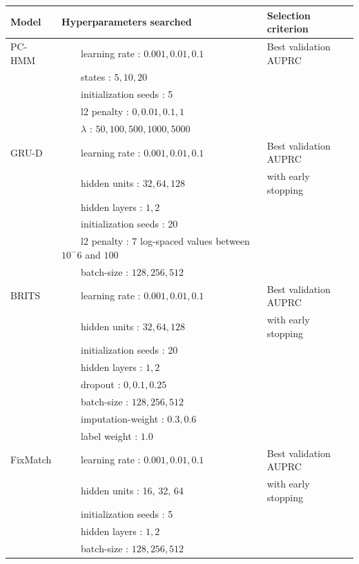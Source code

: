 \newcommand{\tabitem}{~~\llap{\textbullet}~~}
\begin{table}[!t]
  \centering
  \begin{tabular}{|l|l|l|}
    \hline
    Model & Hyperparameters searched & Selection criterion\\
    \hline
    PC-HMM & \tabitem learning rate : $0.001, 0.01, 0.1$ & Best validation AUPRC  \\
    & \tabitem states : $5, 10, 20$ & \\
    & \tabitem initialization seeds : 5 & \\
    & \tabitem l2 penalty : $0, 0.01, 0.1, 1$ & \\
    & \tabitem $\lambda$ : $50, 100, 500, 1000, 5000$ & \\
    \hline
    GRU-D & \tabitem learning rate : $0.001, 0.01, 0.1$ & Best validation AUPRC \\
    & \tabitem hidden units : $32, 64, 128$ & with early stopping \\
    & \tabitem hidden layers : $1, 2$ & \\
    & \tabitem initialization seeds : 20 & \\
    & \tabitem l2 penalty : 7 log-spaced values between $10^-6$ and $100$ & \\
    & \tabitem batch-size : $128, 256, 512$ & \\
    \hline
    BRITS & \tabitem learning rate : $0.001, 0.01, 0.1$ & Best validation AUPRC\\
    & \tabitem hidden units : $32, 64, 128$ & with early stopping \\
    & \tabitem initialization seeds : 20 & \\
     & \tabitem hidden layers : $1, 2$ & \\
    & \tabitem dropout : $0, 0.1, 0.25$ & \\
    & \tabitem batch-size : $128, 256, 512$ & \\
    & \tabitem imputation-weight : $0.3, 0.6$ & \\
    & \tabitem label weight : $1.0$ & \\
    \hline
    FixMatch & \tabitem learning rate : $0.001, 0.01, 0.1$ & Best validation AUPRC \\
    & \tabitem hidden units : 16, 32, 64 & with early stopping \\
    & \tabitem initialization seeds : 5 & \\
    & \tabitem hidden layers : $1, 2$ & \\
    & \tabitem batch-size : $128, 256, 512$ & \\

\end{tabular}
\end{table}
